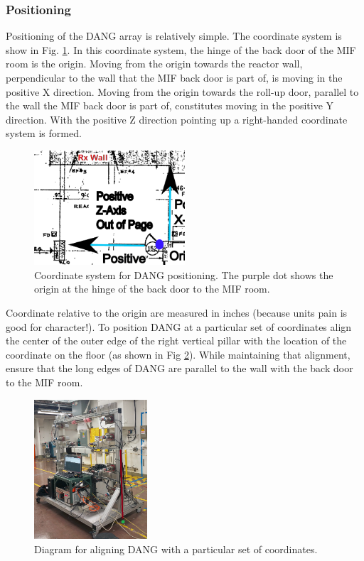 \documentclass[onecolumn, 10pt, letterpaper, twoside]{article}
\begin{document}
\subsubsection{Positioning}
Positioning of the DANG array is relatively simple. The coordinate system is show in Fig. \ref{fig:Coord-System}. In this coordinate system, the hinge of the back door of the MIF room is the origin. Moving from the origin towards the reactor wall, perpendicular to the wall that the MIF back door is part of, is moving in the positive X direction. Moving from the origin towards the roll-up door, parallel to the wall the MIF back door is part of, constitutes moving in the positive Y direction. With the positive Z direction pointing up a right-handed coordinate system is formed.

\begin{figure}[h!]
\begin{center}
\includegraphics[width=0.5\textwidth]{./img/Coord_System.png}
\caption{Coordinate system for DANG positioning. The purple dot shows the origin at the hinge of the back door to the MIF room.}
\label{fig:Coord-System}
\end{center}
\end{figure}

Coordinate relative to the origin are measured in inches (because units pain is good for character!). To position DANG at a particular set of coordinates align the center of the outer edge of the right vertical pillar with the location of the coordinate on the floor (as shown in Fig \ref{fig:Positioning-alignment}). While maintaining that alignment, ensure that the long edges of DANG are parallel to the wall with the back door to the MIF room.

\begin{figure}[h!]
\begin{center}
\includegraphics[width=0.375\textwidth]{./img/Positioning.png}
\caption{Diagram for aligning DANG with a particular set of coordinates.}
\label{fig:Positioning-alignment}
\end{center}
\end{figure}
\end{document}
